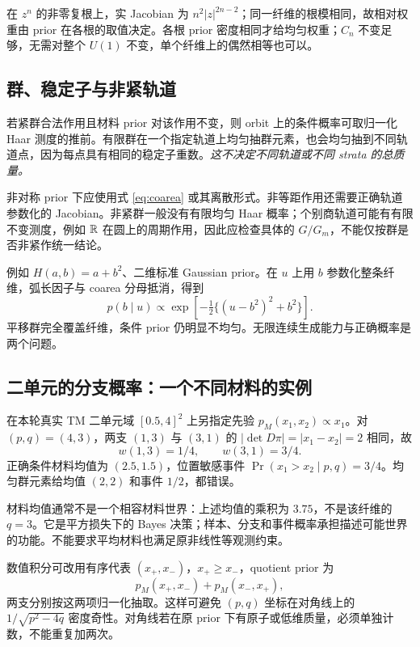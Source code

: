 在 $z^n$ 的非零复根上，实 Jacobian 为 $n^2|z|^{2n-2}$；同一纤维的根模相同，故相对权重由 prior 在各根的取值决定。各根 prior 密度相同才给均匀权重；$C_n$ 不变足够，无需对整个 $U(1)$ 不变，单个纤维上的偶然相等也可以。

\subsection{群、稳定子与非紧轨道}

若紧群合法作用且材料 prior 对该作用不变，则 orbit 上的条件概率可取归一化 Haar 测度的推前。有限群在一个指定轨道上均匀抽群元素，也会均匀抽到不同轨道点，因为每点具有相同的稳定子重数。\emph{这不决定不同轨道或不同 strata 的总质量。}

非对称 prior 下应使用式 \eqref{eq:coarea} 或其离散形式。非等距作用还需要正确轨道参数化的 Jacobian。非紧群一般没有有限均匀 Haar 概率；个别商轨道可能有有限不变测度，例如 $\mathbb R$ 在圆上的周期作用，因此应检查具体的 $G/G_m$，不能仅按群是否非紧作统一结论。

例如 $H(a,b)=a+b^2$、二维标准 Gaussian prior。在 $u$ 上用 $b$ 参数化整条纤维，弧长因子与 coarea 分母抵消，得到
\begin{equation}
p(b\mid u)\propto
\exp\left[-\tfrac12\{(u-b^2)^2+b^2\}\right].
\end{equation}
平移群完全覆盖纤维，条件 prior 仍明显不均匀。无限连续生成能力与正确概率是两个问题。

\subsection{二单元的分支概率：一个不同材料的实例}

在本轮真实 TM 二单元域 $[0.5,4]^2$ 上另指定先验 $p_M(x_1,x_2)\propto x_1$。对 $(p,q)=(4,3)$，两支 $(1,3)$ 与 $(3,1)$ 的 $|\det D\pi|=|x_1-x_2|=2$ 相同，故
\begin{equation}
w(1,3)=1/4,\qquad w(3,1)=3/4.
\end{equation}
正确条件材料均值为 $(2.5,1.5)$，位置敏感事件 $\Pr(x_1>x_2\mid p,q)=3/4$。均匀群元素给均值 $(2,2)$ 和事件 $1/2$，都错误。

材料均值通常不是一个相容材料世界：上述均值的乘积为 $3.75$，不是该纤维的 $q=3$。它是平方损失下的 Bayes 决策；样本、分支和事件概率承担描述可能世界的功能。不能要求平均材料也满足原非线性等观测约束。

数值积分可改用有序代表 $(x_+,x_-)$，$x_+\ge x_-$，quotient prior 为
\begin{equation}
p_M(x_+,x_-)+p_M(x_-,x_+),
\end{equation}
两支分别按这两项归一化抽取。这样可避免 $(p,q)$ 坐标在对角线上的 $1/\sqrt{p^2-4q}$ 密度奇性。对角线若在原 prior 下有原子或低维质量，必须单独计数，不能重复加两次。

